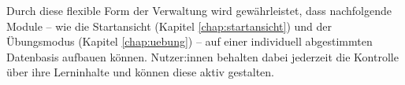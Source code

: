 Durch diese flexible Form der Verwaltung wird gewährleistet, dass nachfolgende Module – wie die Startansicht (Kapitel \ref{chap:startansicht}) und der Übungsmodus (Kapitel \ref{chap:uebung}) – auf einer individuell abgestimmten Datenbasis aufbauen können. Nutzer:innen behalten dabei jederzeit die Kontrolle über ihre Lerninhalte und können diese aktiv gestalten.